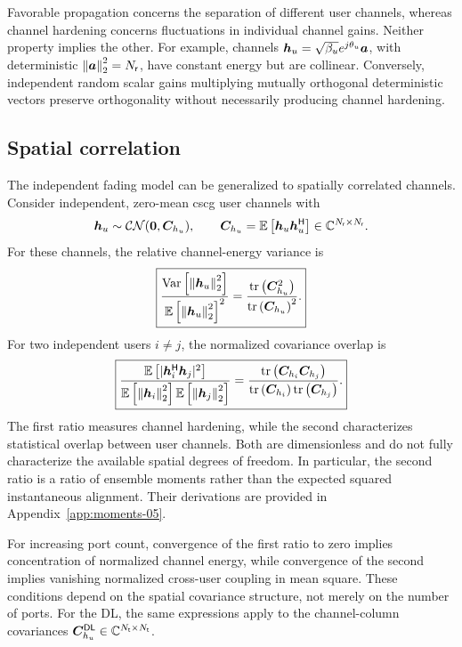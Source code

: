Favorable propagation concerns the separation of different user channels, whereas channel hardening concerns fluctuations in individual channel gains. Neither property implies the other. For example, channels $\bm{h}_u=\sqrt{\beta_u}e^{j\theta_u}\bm{a}$, with deterministic $\left\|\bm{a}\right\|_2^2=N_{\mathsf{r}}$, have constant energy but are collinear. Conversely, independent random scalar gains multiplying mutually orthogonal deterministic vectors preserve orthogonality without necessarily producing channel hardening.

\subsection{Spatial correlation}
The independent fading model can be generalized to spatially correlated channels. Consider independent, zero-mean \ac{cscg} user channels with
\begin{equation*}
	\bm{h}_u\sim\mathcal{CN}(\bm{0},\bm{C}_{h_u}),
	\qquad
	\bm{C}_{h_u}=\mathbb{E}\left[\bm{h}_u{\bm{h}}^{\mathsf{H}}_u\right]
	\in\mathbb{C}^{N_{\mathsf{r}}\times N_{\mathsf{r}}}.
\end{equation*}
For these channels, the relative channel-energy variance is
\begin{equation}
	\boxed{
		\frac{\operatorname{Var}\left[\left\|\bm{h}_u\right\|_2^2\right]}
		{\mathbb{E}\left[\left\|\bm{h}_u\right\|_2^2\right]^2}
		=\frac{\operatorname{tr}\left(\bm{C}_{h_u}^2\right)}
		{\operatorname{tr}\left(\bm{C}_{h_u}\right)^2}.
	}
	\label{eq:corrhard-05}
\end{equation}
For two independent users $i\ne j$, the normalized covariance overlap is
\begin{equation}
	\boxed{
		\frac{\mathbb{E}\left[|{\bm{h}}^{\mathsf{H}}_i\bm{h}_j|^2\right]}
		{\mathbb{E}\left[\left\|\bm{h}_i\right\|_2^2\right]\mathbb{E}\left[\left\|\bm{h}_j\right\|_2^2\right]}
		=\frac{\operatorname{tr}\left(\bm{C}_{h_i}\bm{C}_{h_j}\right)}
		{\operatorname{tr}\left(\bm{C}_{h_i}\right)\operatorname{tr}\left(\bm{C}_{h_j}\right)}.
	}
	\label{eq:overlap-05}
\end{equation}
The first ratio measures channel hardening, while the second characterizes statistical overlap between user channels. Both are dimensionless and do not fully characterize the available spatial degrees of freedom. In particular, the second ratio is a ratio of ensemble moments rather than the expected squared instantaneous alignment. Their derivations are provided in Appendix~\ref{app:moments-05}. 

For increasing port count, convergence of the first ratio to zero implies concentration of normalized channel energy, while convergence of the second implies vanishing normalized cross-user coupling in mean square. These conditions depend on the spatial covariance structure, not merely on the number of ports. For the DL, the same expressions apply to the channel-column covariances $\bm{C}_{h_u}^{\mathsf{DL}}\in\mathbb{C}^{N_{\mathsf{t}}\times N_{\mathsf{t}}}$.

